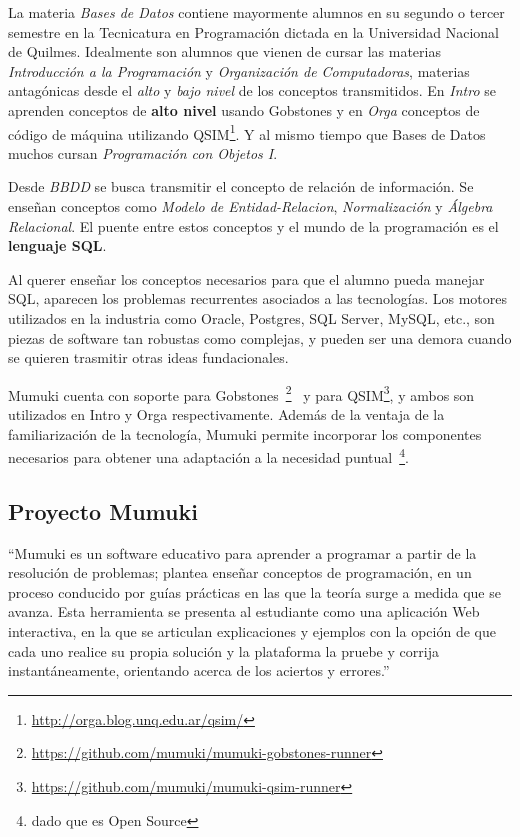 
La materia \textit{Bases de Datos} contiene mayormente
alumnos en su segundo o tercer semestre en
la Tecnicatura en Programación dictada en la Universidad
Nacional de Quilmes. Idealmente son alumnos que
vienen de cursar las materias \textit{Introducción
a la Programación} y \textit{Organización de Computadoras},
materias antagónicas desde el \textit{alto} y \textit{bajo nivel}
de los conceptos transmitidos. En \textit{Intro} se aprenden conceptos
de \textbf{alto nivel} usando Gobstones y en \textit{Orga} conceptos de código
de máquina utilizando QSIM\footnote{\url{http://orga.blog.unq.edu.ar/qsim/}}.
Y al mismo tiempo que Bases de Datos muchos cursan
\textit{Programación con Objetos I}.

Desde \textit{BBDD} se busca transmitir el concepto de relación
de información. Se enseñan conceptos como \textit{Modelo de
Entidad-Relacion}, \textit{Normalización} y \textit{Álgebra Relacional}.
El puente entre estos conceptos y el mundo de la programación
es el \textbf{lenguaje SQL}.

Al querer enseñar los conceptos necesarios para que el alumno
pueda manejar SQL, aparecen los problemas recurrentes asociados
a las tecnologías. Los motores utilizados en la industria como
Oracle, Postgres, SQL Server, MySQL, etc., son piezas de software
tan robustas como complejas, y pueden ser una demora cuando se
quieren trasmitir otras ideas fundacionales.

Mumuki cuenta con soporte para Gobstones~\footnote{\url{https://github.com/mumuki/mumuki-gobstones-runner}}~\cite{MumukiGobstonesAloi}
y para QSIM\footnote{\url{https://github.com/mumuki/mumuki-qsim-runner}},
y ambos son utilizados en Intro y Orga respectivamente.
Además de la ventaja de la familiarización de la tecnología,
Mumuki permite incorporar los componentes necesarios para
obtener una adaptación a la necesidad puntual~\footnote{dado que
es Open Source}.


\subsection{Proyecto Mumuki}

\begin{displayquote}
``Mumuki es un software educativo para aprender a programar a partir de la resolución de problemas;
plantea enseñar conceptos de programación, en un proceso conducido por guías prácticas
en las que la teoría surge a medida que se avanza. Esta herramienta se presenta al
estudiante como una aplicación Web interactiva, en la que se articulan explicaciones
y ejemplos con la opción de que cada uno realice su propia solución y la plataforma
la pruebe y corrija instantáneamente, orientando acerca de los aciertos y errores.''
\end{displayquote}

